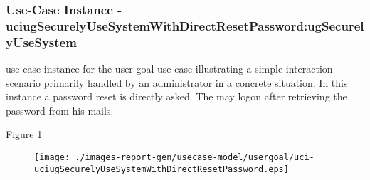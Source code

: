 
	\subsubsection{Use-Case Instance - uciugSecurelyUseSystemWithDirectResetPassword:ugSecurelyUseSystem}
	
	use case instance for the user goal use case  illustrating a simple interaction scenario primarily handled by an administrator in a concrete situation.
	In this instance a password reset is directly asked. The  may logon after retrieving the password from his mails.
	\begin{operationmodel}
	
	\end{operationmodel} 

	
	Figure \ref{fig:lu.uni.lassy.excalibur.examples.icrash-RE-UC-uci-uciugSecurelyUseSystemWithDirectResetPassword}
	
	\begin{figure}[htbp]
	\begin{center}
	
	\texttt{[image: ./images-report-gen/usecase-model/usergoal/uci-uciugSecurelyUseSystemWithDirectResetPassword.eps]}
	\end{center}
	\caption[lu.uni.lassy.excalibur.examples.icrash Sequence Diagram: uci-uciugSecurelyUseSystemWithDirectResetPassword]{}
	\label{fig:lu.uni.lassy.excalibur.examples.icrash-RE-UC-uci-uciugSecurelyUseSystemWithDirectResetPassword}
	\end{figure}
	\vspace{0.5cm}
